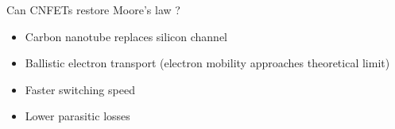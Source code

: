 \documentclass{beamer}
\begin{document}

\begin{frame}{Can CNFETs restore Moore's law ?}
\begin{itemize}
    \item Carbon nanotube replaces silicon channel
    \item Ballistic electron transport (electron mobility approaches theoretical limit)
    \item Faster switching speed %
    \item Lower parasitic losses %
\end{itemize}
\begin{figure}[h]
    \centering
\end{figure}
\end{frame}

\end{document}
